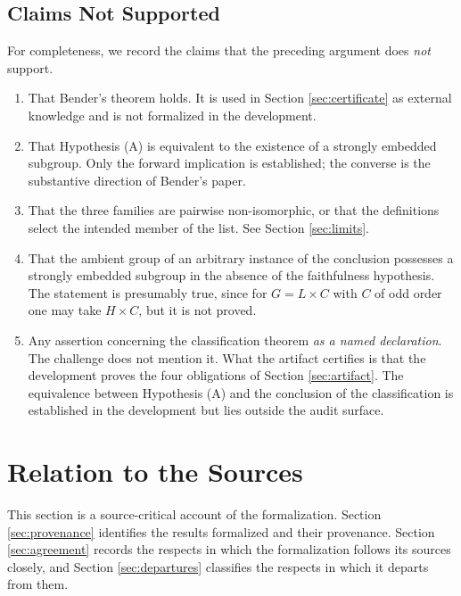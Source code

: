 \documentclass{article}
\begin{document}
\subsection{Claims Not Supported}
\label{sec:not-certified}

For completeness, we record the claims that the preceding argument does
\emph{not} support.
\begin{enumerate}
  \item That Bender's theorem holds. It is used in Section
  \ref{sec:certificate} as external knowledge and is not formalized in the
  development.

  \item That Hypothesis (A) is equivalent to the existence of a strongly
  embedded subgroup. Only the forward implication is established; the converse
  is the substantive direction of Bender's paper.

  \item That the three families are pairwise non-isomorphic, or that the
  definitions select the intended member of the list. See Section
  \ref{sec:limits}.

  \item That the ambient group of an arbitrary instance of the conclusion
  possesses a strongly embedded subgroup in the absence of the faithfulness
  hypothesis. The statement is presumably true, since for \(G=L\times C\) with
  \(C\) of odd order one may take \(H\times C\), but it is not proved.

  \item Any assertion concerning the classification theorem \emph{as a named
  declaration}. The challenge does not mention it. What the artifact certifies is
  that the development proves the four obligations of Section \ref{sec:artifact}.
  The equivalence between Hypothesis (A) and the conclusion of the
  classification is established in the development but lies outside the audit
  surface.
\end{enumerate}

\section{Relation to the Sources}
\label{sec:sources}

This section is a source-critical account of the formalization. Section
\ref{sec:provenance} identifies the results formalized and their provenance.
Section \ref{sec:agreement} records the respects in which the formalization
follows its sources closely, and Section \ref{sec:departures} classifies the
respects in which it departs from them.
\end{document}
